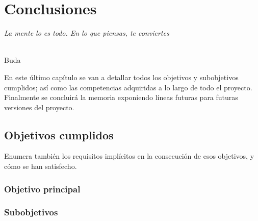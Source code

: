 \chapter{Conclusiones}
\label{cap:capitulo8}

\begin{flushright}
\begin{minipage}[]{10cm}
\emph{La mente lo es todo. En lo que piensas, te conviertes}\\
\end{minipage}\\

Buda\\
\end{flushright}

\vspace{1cm}

En este último capítulo se van a detallar todos los objetivos y subobjetivos cumplidos; así como las competencias adquiridas a lo largo de todo el proyecto. Finalmente se concluirá la memoria exponiendo líneas futuras para futuras versiones del proyecto.


\section{Objetivos cumplidos}

Enumera también los requisitos implícitos en la consecución de esos objetivos, y cómo se han satisfecho.\\

\subsection{Objetivo principal}





\subsection{Subobjetivos}

